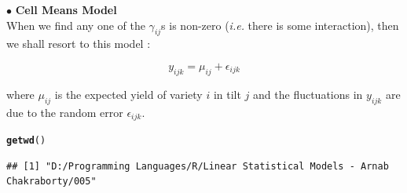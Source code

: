 \documentclass[11pt, a4paper]{article}\usepackage[]{graphicx}\usepackage[dvipsnames]{xcolor}
\makeatletter
\newcommand{\hlstd}[1]{\textcolor[rgb]{0.345,0.345,0.345}{#1}}%
\newcommand{\hlkwd}[1]{\textcolor[rgb]{0.737,0.353,0.396}{\textbf{#1}}}%
\newenvironment{kframe}{%
 \def\at@end@of@kframe{}%
 \ifinner\ifhmode%
  \def\at@end@of@kframe{\end{minipage}}%
  \begin{minipage}{\columnwidth}%
 \fi\fi%
 \def\FrameCommand##1{\hskip\@totalleftmargin \hskip-\fboxsep
 \colorbox{shadecolor}{##1}\hskip-\fboxsep
     \hskip-\linewidth \hskip-\@totalleftmargin \hskip\columnwidth}%
 \MakeFramed {\advance\hsize-\width
   \@totalleftmargin\z@ \linewidth\hsize
   \@setminipage}}%
 {\par\unskip\endMakeFramed%
 \at@end@of@kframe}
\newenvironment{knitrout}{}{} %
\makeatother
\begin{document}
$\bullet$ \textbf{Cell Means Model} \\

When we find any one of the $\gamma_{ij}$s is non-zero (\textit{i.e.} there is some interaction), then we shall resort to this model :

$$y_{ijk} = \mu_{ij} + \epsilon_{ijk}$$

where $\mu_{ij}$ is the expected yield of variety $i$ in tilt $j$ and the fluctuations in $y_{ijk}$ are due to the random error $\epsilon_{ijk}$.

\begin{knitrout}
\color{fgcolor}\begin{kframe}
\begin{alltt}
\hlkwd{getwd}\hlstd{()}
\end{alltt}
\begin{verbatim}
## [1] "D:/Programming Languages/R/Linear Statistical Models - Arnab Chakraborty/005"
\end{verbatim}
\end{kframe}
\end{knitrout}
\end{document}
